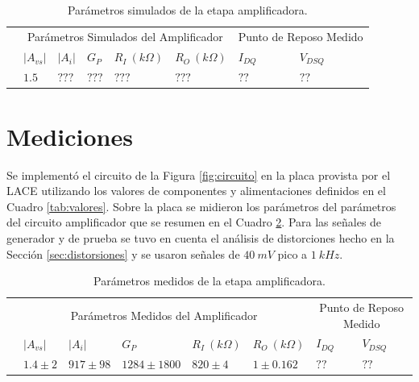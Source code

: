 \documentclass[a4paper, 10pt, spanish]{article}
\begin{document}
\begin{table}[h]
\centering
\begin{tabularx}{0.9\textwidth}{XXXXXXXX}
\hline
\multicolumn{1}{c}{}				& \multicolumn{5}{c}{Parámetros Simulados del Amplificador}						& \multicolumn{2}{c}{Punto de Reposo Medido} \\
									\cmidrule(r){2-6}														\cmidrule(r){7-8}
\multicolumn{1}{c}{}				& $|A_{vs}|$  		& $|A_{i}|$ 		& $G_P$ 			& $R_I\ (k\Omega)$ & $R_O\ (k\Omega)$ 		& $I_{DQ}$ 			& $V_{DSQ}$			\\
									\cmidrule(r){2-2} \cmidrule(r){3-3} \cmidrule(r){4-4} 	\cmidrule(r){5-5} 	\cmidrule(r){6-6} \cmidrule(r){7-7} 	\cmidrule(r){8-8}
\multicolumn{1}{c}{}				& $1.5$	& $???$	& $???$ & $???$ & $???$ & $??$& $??$\\
\hline
\end{tabularx}
\caption{Parámetros simulados de la etapa amplificadora.}
\label{tab:simulaciones}
\end{table}


\newpage
\section{Mediciones}\label{sec:mediciones}

Se implementó el circuito de la Figura \ref{fig:circuito} en la placa provista por el LACE utilizando los valores de componentes y alimentaciones definidos en el Cuadro \ref{tab:valores}. Sobre la placa se midieron los parámetros del parámetros del circuito amplificador que se resumen en el Cuadro \ref{tab:mediciones}. Para las señales de generador y de prueba se tuvo en cuenta el análisis de distorciones hecho en la Sección \ref{sec:distorsiones} y se usaron señales de $40\ mV$ pico a $1\ kHz$.


\begin{table}[h]
\centering
\begin{tabularx}{0.9\textwidth}{XXXXXXXX}
\hline
\multicolumn{1}{c}{}				& \multicolumn{5}{c}{Parámetros Medidos del Amplificador}						& \multicolumn{2}{c}{Punto de Reposo Medido} \\
									\cmidrule(r){2-6}														\cmidrule(r){7-8}
\multicolumn{1}{c}{}				& $|A_{vs}|$  		& $|A_{i}|$ 		& $G_P$ 			& $R_I\ (k\Omega)$ & $R_O\ (k\Omega)$ 		& $I_{DQ}$ 			& $V_{DSQ}$			\\
									\cmidrule(r){2-2} \cmidrule(r){3-3} \cmidrule(r){4-4} 	\cmidrule(r){5-5} 	\cmidrule(r){6-6} \cmidrule(r){7-7} 	\cmidrule(r){8-8}
\multicolumn{1}{c}{}				& $1.4 \pm 2$	& $917 \pm 98$	& $1284 \pm 1800$ & $820 \pm 4 $ & $1 \pm 0.162 $ & $??$& $??$\\
\hline
\end{tabularx}
\caption{Parámetros medidos de la etapa amplificadora.}
\label{tab:mediciones}
\end{table}
\end{document}
